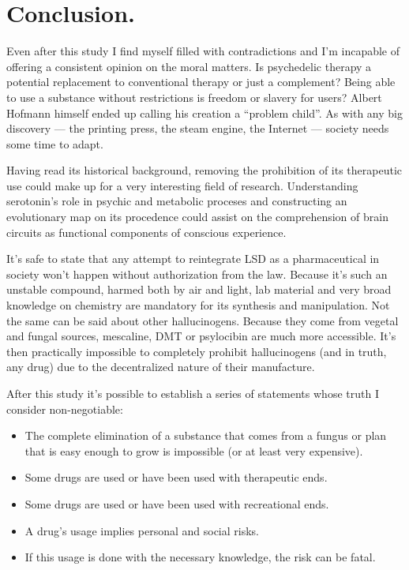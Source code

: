 \section{Conclusion.}

Even after this study I find myself filled with contradictions and I'm incapable of offering a consistent opinion on the moral matters. Is psychedelic therapy a potential replacement to conventional therapy or just a complement? Being able to use a substance without restrictions is freedom or slavery for users? Albert Hofmann himself ended up calling his creation a \enquote{problem child}. As with any big discovery --- the printing press, the steam engine, the Internet --- society needs some time to adapt.

Having read its historical background, removing the prohibition of its therapeutic use could make up for a very interesting field of research. Understanding serotonin's role in psychic and metabolic proceses and constructing an evolutionary map on its procedence could assist on the comprehension of brain circuits as functional components of conscious experience.

It's safe to state that any attempt to reintegrate LSD as a pharmaceutical in society won't happen without authorization from the law. Because it's such an unstable compound, harmed both by air and light, lab material and very broad knowledge on chemistry are mandatory for its synthesis and manipulation. Not the same can be said about other hallucinogens. Because they come from vegetal and fungal sources, mescaline, DMT or psylocibin are much more accessible. It's then practically impossible to completely prohibit hallucinogens (and in truth, any drug) due to the decentralized nature of their manufacture.

After this study it's possible to establish a series of statements whose truth I consider non-negotiable:

\begin{itemize}
	\item The complete elimination of a substance that comes from a fungus or plan that is easy enough to grow is impossible (or at least very expensive).
	\item Some drugs are used or have been used with therapeutic ends.
	\item Some drugs are used or have been used with recreational ends.
	\item A drug's usage implies personal and social risks.
	\item If this usage is done with the necessary knowledge, the risk can be fatal.
\end{itemize}

